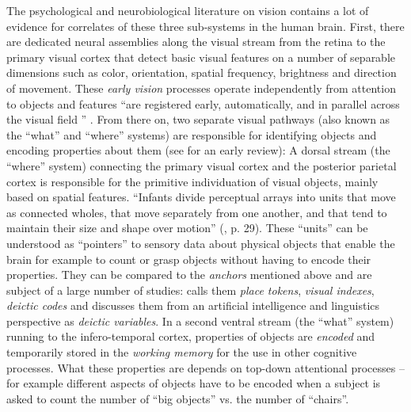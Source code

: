 The psychological and neurobiological literature on vision contains a
lot of evidence for correlates of these three sub-systems in the human
brain. First, there are dedicated neural assemblies along the visual
stream from the retina to the primary visual cortex that detect basic
visual features on a number of separable dimensions such as color,
orientation, spatial frequency, brightness and direction of movement.
These \emph{early vision} processes operate independently from
attention to objects and features ``are registered early,
automatically, and in parallel across the visual field ''
\citep[p. 98]{treisman80feature-integration}. From there on, two
separate visual pathways (also known as the ``what'' and ``where''
systems) are responsible for identifying objects and encoding
properties about them (see \citealp{mishkin83object} for an early
review): A dorsal stream (the ``where'' system) connecting the primary
visual cortex and the posterior parietal cortex is responsible for the
primitive individuation of visual objects, mainly based on spatial
features. ``Infants divide perceptual arrays into units that move as
connected wholes, that move separately from one another, and that tend
to maintain their size and shape over motion''
(\citealp{spelke90principles}, p. 29). These ``units'' can be
understood as ``pointers'' to sensory data about physical objects that
enable the brain for example to count or grasp objects without having
to encode their properties. They can be compared to the \emph{anchors}
mentioned above and are subject of a large number of studies:
\cite{marr82vision} calls them \emph{place tokens},
\cite{pylyshyn01visual,pylyshyn89role} \emph{visual indexes},
\cite{ballard97deictic} \emph{deictic codes} and
\cite{hurford03neural} discusses them from an artificial intelligence
and linguistics perspective as \emph{deictic variables}. In a second
ventral stream (the ``what'' system) running to the infero-temporal
cortex, properties of objects are \emph{encoded} and temporarily stored in
the \emph{working memory} \citep{baddeley86working-memory} for the use
in other cognitive processes. What these properties are depends on
top-down attentional processes -- for example different aspects of objects
have to be encoded when a subject is asked to count the number of
``big objects'' vs. the number of ``chairs''.


